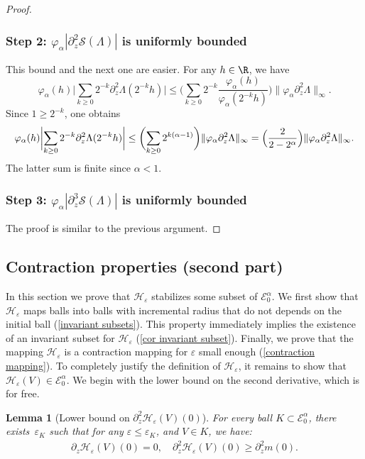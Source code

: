 \documentclass[10pt]{amsart}
\let\mathcal\mathscr
\newcommand{\cS}{\mathcal{S}}
\theoremstyle{plain}
\newtheorem{lem}[thm]{Lemma}
\theoremstyle{definition}
\renewcommand{\H}{\mathcal{H}_\eps}
\let\eps\varepsilon
\newcommand{\abs}[1]{\left\lvert#1\right\rvert}
\newcommand{\bbabs}[1]{\biggl\lvert#1\biggr\rvert}
\newcommand{\Ea}{\mathcal{E}^\alpha}
\newcommand{\Eaz}{\mathcal{E}^\alpha_0}
\newcommand{\vphia}{\varphi_\alpha}
\begin{document}
\begin{proof}
\subsubsection*{Step 2: $ \vphia\abs{ \partial_z^2 \cS(\Lambda)} $ is uniformly bounded} This bound and the next one are easier.
For any $h \in \R $, we have
\begin{equation*}
\vphia(h) \bbabs{ \sum_{k\geq 0} 2^{-k} \partial_z^2 \Lambda (2^{-k}h) } \leq \biggl (\sum_{k \geq 0} 2^{-k} \dfrac{\vphia(h)}{\vphia(2^{-k}h)} \biggr) \|\vphia \partial_z^2 \Lambda \|_{\infty}.
\end{equation*}
Since $1\geq 2^{-k}$, one obtains
\begin{equation*}
\vphia(h) \bbabs{ \sum_{k\geq 0} 2^{-k} \partial_z^2 \Lambda (2^{-k}h) } \leq \biggl(\sum_{k \geq 0} 2^{k (\alpha-1)} \biggr) \|\vphia \partial_z^2 \Lambda \|_{\infty} = \Bigl (\dfrac{2}{2 - 2^\alpha} \Bigr) \|\vphia \partial_z^2 \Lambda \|_{\infty}.
\end{equation*}
The latter sum is finite since $\alpha<1$.

\subsubsection*{Step 3: $ \vphia\abs{ \partial_z^3 \cS(\Lambda)} $ is uniformly bounded} The proof is similar to the previous argument.
\end{proof}

\subsection{Contraction properties (second part)}\label{sec cotraction properties}
In this section we prove that $\H$ stabilizes some subset of $\Ea_0$. We first show that $\H$ maps balls into balls with incremental radius that do not depends on the initial ball (\cref{invariant subsets}). This property immediately implies the existence of an invariant subset for $\H$ (\cref{cor invariant subset}). Final\-ly, we prove that the mapping $\H$ is a contraction mapping for $\eps$ small enough (\cref{contraction mapping}).
To completely justify the definition of $\H$, it remains to show that $\H(V) \in \Eaz$. We begin with the lower bound on the second derivative, which is for free.

\begin{lem}[Lower bound on $\partial_z^2 \H(V)(0)$]\label{lowerbound p2HV}
For every ball $K\subset \Eaz$, there exists~$\eps_K$ such that for any $\eps \leq \eps_K$, and $V \in K$, we have:
\begin{align*}
\partial_z \H(V)(0) = 0, \quad \partial_z^2 \H(V)(0) \geq \partial_z^2 m(0).
\end{align*}
\end{lem}
\end{document}
